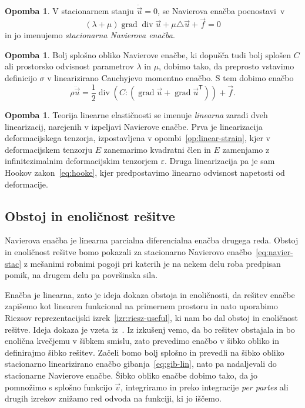 \documentclass[12pt,a4paper,twoside]{article}
\theoremstyle{definition} %
\newtheorem{opomba}[definicija]{Opomba}
\theoremstyle{plain} %
\numberwithin{equation}{section}
\newcommand{\T}{\mathsf{T}}
\newcommand{\lap}{\triangle}
\renewcommand{\div}{\operatorname{div}}
\newcommand{\grad}{\operatorname{grad}}
\newcommand{\eps}{\varepsilon}
\newcommand{\vv}{\vec{v}}
\newcommand{\vu}{\vec{u}}
\newcommand{\vf}{\vec{f}}
\newcommand{\ts}{\sigma}
\begin{document}
\begin{opomba}
  V stacionarnem stanju $\dot{\vu} = 0$, se Navierova enačba poenostavi~v
  \begin{equation}
    (\lambda + \mu)\grad\div \vu + \mu \lap \vu + \vf  = 0
  \label{eq:navier-stac}
\end{equation}
in jo imenujemo \emph{stacionarna Navierova enačba}.
\end{opomba}
\begin{opomba}
  Bolj splošno obliko Navierove enačbe, ki dopušča tudi bolj splošen $C$ ali prostorsko odvisnost
  parametrov $\lambda$ in $\mu$, dobimo tako, da preprosto vstavimo definicijo $\ts$ v linearizirano
  Cauchyjevo momentno enačbo. S tem dobimo enačbo
  \begin{equation}
    \rho\ddot \vu = \frac12 \div(C:(\grad \vu + \grad\vu^\T)) + \vf.
    \label{eq:navier-general}
  \end{equation}
\end{opomba}
\begin{opomba}
  Teorija linearne elastičnosti se imenuje \emph{linearna} zaradi dveh linearizacij,
  narejenih v izpeljavi Navierove enačbe. Prva je linearizacija deformacijskega tenzorja,
  izpostavljena v opombi~\ref{op:linear-strain}, kjer v deformacijskem tenzorju $E$ zanemarimo
  kvadratni člen in $E$ zamenjamo z infinitezimalnim deformacijskim tenzorjem $\eps$. Druga
  linearizacija pa je sam Hookov zakon~\eqref{eq:hooke}, kjer predpostavimo linearno odvisnost
  napetosti od deformacije.
\end{opomba}

\subsection{Obstoj in enoličnost rešitve}
\label{sec:obstoj-enol}
Navierova enačba je linearna parcialna diferencialna enačba drugega reda.
Obstoj in enoličnost rešitve bomo pokazali za stacionarno Navierovo
enačbo~\eqref{eq:navier-stac} z mešanimi robnimi pogoji pri katerih je na nekem
delu roba predpisan pomik, na drugem delu pa površinska sila.

Enačba je linearna, zato je ideja dokaza obstoja in enoličnosti, da rešitev enačbe zapišemo kot
linearen funkcional na primernem prostoru in nato uporabimo Riezsov reprezentacijski
izrek~\ref{izr:riesz-useful}, ki nam bo dal obstoj in enoličnost rešitve. Ideja dokaza je
vzeta iz~\cite[izrek 3.17.1, str.\ 232]{lebedev2009introduction}. Iz izkušenj vemo, da bo rešitev
obstajala in bo enolična kvečjemu v šibkem smislu, zato prevedimo enačbo v šibko obliko in
definirajmo šibko rešitev. Začeli bomo bolj splošno in prevedli na šibko obliko stacionarno
linearizirano enačbo gibanja~\eqref{eq:gib-lin}, nato pa nadaljevali do stacionarne Navierove
enačbe. Šibko obliko enačbe dobimo tako, da jo pomnožimo s splošno funkcijo $\vv$, integriramo in
preko integracije \emph{per partes} ali drugih izrekov znižamo red odvoda na funkciji, ki jo iščemo.
\end{document}
